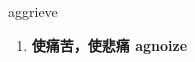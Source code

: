 
\begin{frame}
{\huge aggrieve}
\begin{center}
\begin{enumerate}\Large
  \item \textbf{使痛苦，使悲痛 agnoize}
\end{enumerate}
\end{center}
\end{frame}
